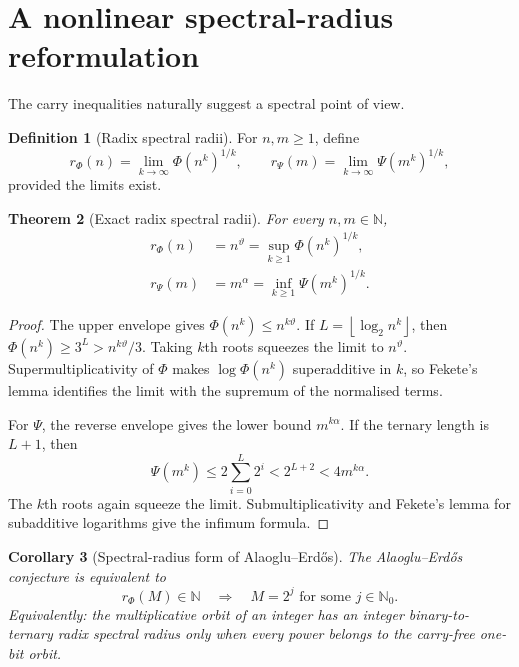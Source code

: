 \documentclass[11pt]{article}
\newtheorem{theorem}{Theorem}[section]
\newtheorem{corollary}[theorem]{Corollary}
\theoremstyle{definition}
\newtheorem{definition}[theorem]{Definition}
\theoremstyle{remark}
\newcommand{\N}{\mathbb N}
\newcommand{\Nzero}{\mathbb N_0}
\newcommand{\floor}[1]{\left\lfloor #1\right\rfloor}
\newcommand{\PhiMap}{\Phi}
\newcommand{\PsiMap}{\Psi}
\newcommand{\thetaAE}{\vartheta}
\newcommand{\alphaAE}{\alpha}
\begin{document}
\section{A nonlinear spectral-radius reformulation}

The carry inequalities naturally suggest a spectral point of view.

\begin{definition}[Radix spectral radii]
For $n,m\ge1$, define
\[
 r_\Phi(n)=\lim_{k\to\infty}\PhiMap(n^k)^{1/k},
 \qquad
 r_\Psi(m)=\lim_{k\to\infty}\PsiMap(m^k)^{1/k},
\]
provided the limits exist.
\end{definition}

\begin{theorem}[Exact radix spectral radii]\label{thm:spectral-radius}
For every $n,m\in\N$,
\begin{align}
 r_\Phi(n)&=n^{\thetaAE}
 =\sup_{k\ge1}\PhiMap(n^k)^{1/k},
 \label{eq:phi-spectral}\\
 r_\Psi(m)&=m^{\alphaAE}
 =\inf_{k\ge1}\PsiMap(m^k)^{1/k}.
 \label{eq:psi-spectral}
\end{align}
\end{theorem}

\begin{proof}
The upper envelope gives
$\PhiMap(n^k)\le n^{k\thetaAE}$.  If $L=\floor{\log_2n^k}$, then
$\PhiMap(n^k)\ge3^L>n^{k\thetaAE}/3$.  Taking $k$th roots squeezes the limit
to $n^{\thetaAE}$.  Supermultiplicativity of $\PhiMap$ makes
$\log\PhiMap(n^k)$ superadditive in $k$, so Fekete's lemma identifies the
limit with the supremum of the normalised terms.

For $\PsiMap$, the reverse envelope gives the lower bound
$m^{k\alphaAE}$.  If the ternary length is $L+1$, then
\[
 \PsiMap(m^k)\le2\sum_{i=0}^{L}2^i<2^{L+2}<4m^{k\alphaAE}.
\]
The $k$th roots again squeeze the limit.  Submultiplicativity and Fekete's
lemma for subadditive logarithms give the infimum formula.
\end{proof}

\begin{corollary}[Spectral-radius form of Alaoglu--Erd\H{o}s]
\label{cor:spectral-AE}
The Alaoglu--Erd\H{o}s conjecture is equivalent to
\[
  \boxed{
  r_\Phi(M)\in\N\quad\Longrightarrow\quad M=2^j
  \text{ for some }j\in\Nzero.}
\]
Equivalently: the multiplicative orbit of an integer has an integer
binary-to-ternary radix spectral radius only when every power belongs to the
carry-free one-bit orbit.
\end{corollary}
\end{document}
